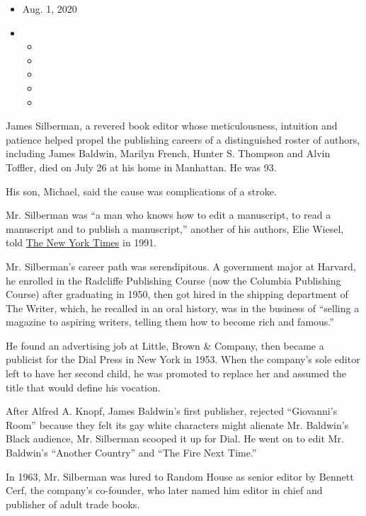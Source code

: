 \begin{itemize}
\item
  Aug. 1, 2020
\item
  \begin{itemize}
  \item
  \item
  \item
  \item
  \item
  \end{itemize}
\end{itemize}

James Silberman, a revered book editor whose meticulousness, intuition
and patience helped propel the publishing careers of a distinguished
roster of authors, including James Baldwin, Marilyn French, Hunter S.
Thompson and Alvin Toffler, died on July 26 at his home in Manhattan. He
was 93.

His son, Michael, said the cause was complications of a stroke.

Mr. Silberman was ``a man who knows how to edit a manuscript, to read a
manuscript and to publish a manuscript,'' another of his authors, Elie
Wiesel, told
\href{https://www.nytimes3xbfgragh.onion/1991/10/30/business/the-media-business-head-of-summit-books-is-said-to-be-leaving.html}{The
New York Times} in 1991.

Mr. Silberman's career path was serendipitous. A government major at
Harvard, he enrolled in the Radcliffe Publishing Course (now the
Columbia Publishing Course) after graduating in 1950, then got hired in
the shipping department of The Writer, which, he recalled in an oral
history, was in the business of ``selling a magazine to aspiring
writers, telling them how to become rich and famous.''

He found an advertising job at Little, Brown \& Company, then became a
publicist for the Dial Press in New York in 1953. When the company's
sole editor left to have her second child, he was promoted to replace
her and assumed the title that would define his vocation.

After Alfred A. Knopf, James Baldwin's first publisher, rejected
``Giovanni's Room'' because they felt its gay white characters might
alienate Mr. Baldwin's Black audience, Mr. Silberman scooped it up for
Dial. He went on to edit Mr. Baldwin's ``Another Country'' and ``The
Fire Next Time.''

In 1963, Mr. Silberman was lured to Random House as senior editor by
Bennett Cerf, the company's co-founder, who later named him editor in
chief and publisher of adult trade books.

